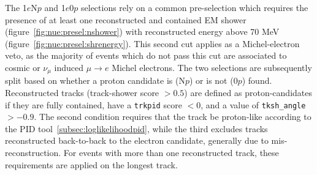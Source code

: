 \documentclass[a4paper]{article}
\begin{document}
The 1$e$N$p$ and 1$e$0$p$ selections rely on a common pre-selection which requires the presence of at least one reconstructed and contained EM shower (figure~\ref{fig:nue:presel:nshower}) with reconstructed energy above 70 MeV (figure~\ref{fig:nue:presel:shrenergy}). This second cut applies as a Michel-electron veto, as the majority of events which do not pass this cut are associated to cosmic or $\nu_{\mu}$ induced $\mu \rightarrow e$ Michel electrons. The two selections are subsequently split based on whether a proton candidate is (N$p$) or is not (0$p$) found. Reconstructed tracks (track-shower score $> 0.5$) are defined as proton-candidates if they are fully contained,  have a \texttt{trkpid} score $< 0$, and a value of \texttt{tksh\_angle} $> -0.9$. The second condition requires that the track be proton-like according to the PID tool~\ref{subsec:loglikelihoodpid}, while the third excludes tracks reconstructed back-to-back to the electron candidate, generally due to mis-reconstruction. For events with more than one reconstructed track, these requirements are applied on the longest track.
\end{document}
